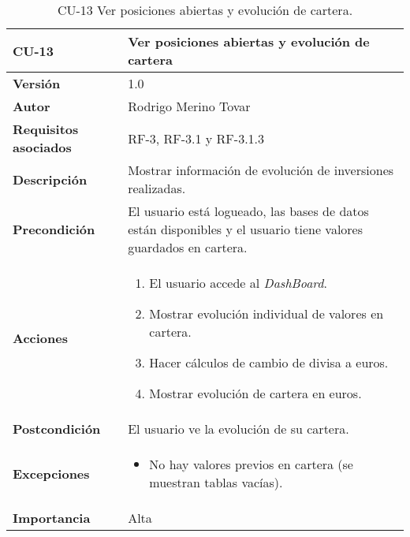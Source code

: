 \begin{table}[p]
	\centering
	\begin{tabularx}{\linewidth}{ p{} p{} }
		\toprule
		\textbf{CU-13}    & \textbf{Ver posiciones abiertas y evolución de cartera}\\
		\toprule
		\textbf{Versión}              & 1.0    \\
		\textbf{Autor}                & Rodrigo Merino Tovar \\
		\textbf{Requisitos asociados} & RF-3, RF-3.1 y RF-3.1.3 \\
		\textbf{Descripción}          & Mostrar información de evolución de inversiones realizadas.\\
		\textbf{Precondición}         & El usuario está logueado, las bases de datos están disponibles y el usuario tiene valores guardados en cartera.  \\
		\textbf{Acciones}             &
		\begin{enumerate}
			\def\labelenumi{\arabic{enumi}.}
			\tightlist
			\item El usuario accede al \emph{DashBoard}. 
			\item Mostrar evolución individual de valores en cartera.
			\item Hacer cálculos de cambio de divisa a euros.  
			\item Mostrar evolución de cartera en euros.
		\end{enumerate}\\
		\textbf{Postcondición}        & El usuario ve la evolución de su cartera. \\
		\textbf{Excepciones}          & 
		\begin{itemize}
			\tightlist
			\item No hay valores previos en cartera (se muestran tablas vacías).
		\end{itemize} \\
		\textbf{Importancia}          & Alta \\
		\bottomrule
	\end{tabularx}
	\caption{CU-13 Ver posiciones abiertas y evolución de cartera.}
\end{table}


